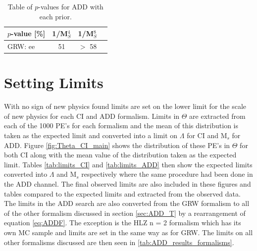     \begin {table}[h]
        \begin{center}
        \begin{tabular}{ | l | c | c | c | } 
            \hline
            $p$-value [\%] & 1/M$_S^4$ & 1/M$_S^8$ \\
            \hline
            GRW: ee & 51 & $>$ 58 \\
            \hline
        \end{tabular}
        \caption{Table of $p$-values for ADD with each prior.}
        \label{tab:pvalue_ADD}
        \end{center}
    \end {table}






\section{Setting Limits}
    
    With no sign of new physics found limits are set on the lower limit for the scale of new physics for each CI and ADD formalism. Limits in $\Theta$ are extracted from each of the 1000 PE's for each formalism and the mean of this distribution is taken as the expected limit and converted into a limit on $\Lambda$ for CI and M$_{s}$ for ADD. Figure \ref{fig:Theta_CI_main} shows the distribution of these PE's in $\Theta$ for both CI along with the mean value of the distribution taken as the expected limit. Tables \ref{tab:limits_CI} and \ref{tab:limits_ADD} then show the expected limits converted into $\Lambda$ and M$_{s}$ respectively where the same procedure had been done in the ADD channel. The final observed limits are also included in these figures and tables compared to the expected limits and extracted from the observed data. The limits in the ADD search are also converted from the GRW formalism to all of the other formalism discussed in section \ref{sec:ADD_T} by a rearrangement of equation \ref{eq:ADDF}. The exception is the HLZ n = 2 formalism which has its own MC sample and limits are set in the same way as for GRW. The limits on all other formalisms discussed are then seen in \ref{tab:ADD_results_formalisms}.



